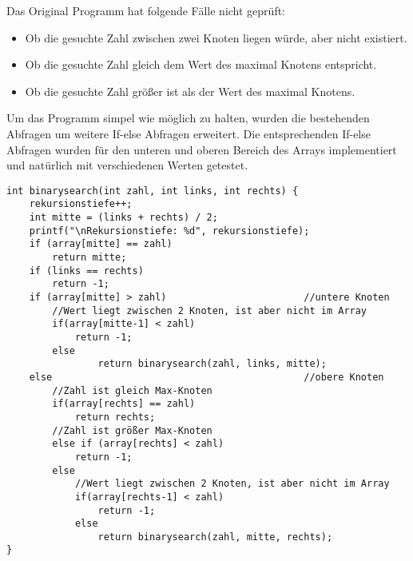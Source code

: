 \documentclass[12pt]{article}
\begin{document}
Das Original Programm hat folgende Fälle nicht geprüft:

\begin{itemize}
    \item Ob die gesuchte Zahl zwischen zwei Knoten liegen würde, aber nicht existiert.
    \item Ob die gesuchte Zahl gleich dem Wert des maximal Knotens entspricht.
    \item Ob die gesuchte Zahl größer ist als der Wert des maximal Knotens.
\end{itemize}

Um das Programm simpel wie möglich zu halten, wurden die bestehenden Abfragen um weitere If-else Abfragen erweitert. Die entsprechenden If-else Abfragen wurden für den unteren und oberen Bereich des Arrays implementiert und natürlich mit verschiedenen Werten getestet.\\

\begin{lstlisting}
int binarysearch(int zahl, int links, int rechts) {
    rekursionstiefe++;
    int mitte = (links + rechts) / 2;
    printf("\nRekursionstiefe: %d", rekursionstiefe);
    if (array[mitte] == zahl)
        return mitte; 
    if (links == rechts)
        return -1; 
    if (array[mitte] > zahl)                        //untere Knoten
        //Wert liegt zwischen 2 Knoten, ist aber nicht im Array
        if(array[mitte-1] < zahl) 
            return -1;
        else 
                return binarysearch(zahl, links, mitte); 
    else                                            //obere Knoten
        //Zahl ist gleich Max-Knoten
        if(array[rechts] == zahl)
            return rechts;
        //Zahl ist größer Max-Knoten
        else if (array[rechts] < zahl)
            return -1;
        else
            //Wert liegt zwischen 2 Knoten, ist aber nicht im Array
            if(array[rechts-1] < zahl)
                return -1;
            else
                return binarysearch(zahl, mitte, rechts);
}
\end{lstlisting}
\end{document}

